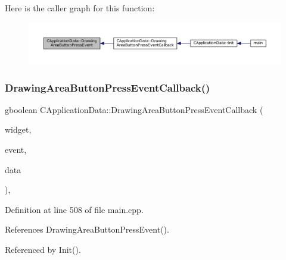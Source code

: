 Here is the caller graph for this function\+:\nopagebreak
\begin{figure}[H]
\begin{center}
\leavevmode
\includegraphics[width=350pt]{classCApplicationData_ae7516e29f629998e4068ae1584d0237c_icgraph}
\end{center}
\end{figure}
\hypertarget{classCApplicationData_aaa867e992733fa1e88e67c026c8a2947}{}\label{classCApplicationData_aaa867e992733fa1e88e67c026c8a2947} 
\subsubsection{\texorpdfstring{Drawing\+Area\+Button\+Press\+Event\+Callback()}{DrawingAreaButtonPressEventCallback()}}
{\footnotesize\ttfamily gboolean C\+Application\+Data\+::\+Drawing\+Area\+Button\+Press\+Event\+Callback (\begin{DoxyParamCaption}\item[{Gtk\+Widget $\ast$}]{widget,  }\item[{Gdk\+Event\+Button $\ast$}]{event,  }\item[{gpointer}]{data }\end{DoxyParamCaption})\hspace{0.3cm}{\ttfamily [static]}, {\ttfamily [protected]}}



Definition at line 508 of file main.\+cpp.



References Drawing\+Area\+Button\+Press\+Event().



Referenced by Init().


